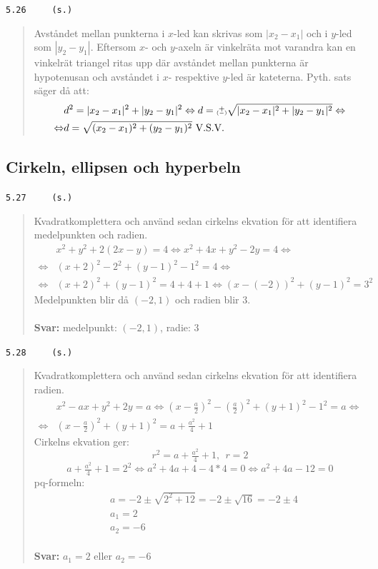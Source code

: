 \documentclass[a4paper]{article}
\newcommand{\tskcol}[1]{\textcolor{tskcol}{#1}}
\newcommand\varpm{\mathbin{\vcenter{\hbox{%
				\oalign{\hfil$\scriptstyle+$\hfil\cr
					\noalign{\kern-.5ex}					
					$\scriptscriptstyle({-})$\cr}%
			}}}}
\begin{document}
	\texttt{\tskcol{5.26~~~~ (s.)}}
	\begin{quotation}
		\noindent
		Avståndet mellan punkterna i $x$-led kan skrivas som $|x_2-x_1|$ och i $y$-led som $|y_2-y_1|$. Eftersom $x$- och $y$-axeln är vinkelräta mot varandra kan en vinkelrät triangel ritas upp där avståndet mellan punkterna är hypotenusan och avståndet i $x$- respektive $y$-led är kateterna. Pyth. sats säger då att: 
		\begin{align*}
		&d^2=|x_2-x_1|^2+|y_2-y_1|^2 \Leftrightarrow
		d=\varpm\sqrt{|x_2-x_1|^2+|y_2-y_1|^2} \Leftrightarrow \\ \Leftrightarrow
		&d=\sqrt{(x_2-x_1)^2+(y_2-y_1)^2} \text{ V.S.V.}
		\end{align*}
	\end{quotation}
	
	\subsection*{Cirkeln, ellipsen och hyperbeln}
	
	\texttt{\tskcol{5.27~~~~ (s.)}}
	\begin{quotation}
		\noindent
		Kvadratkomplettera och använd sedan cirkelns ekvation för att identifiera medelpunkten och radien.
		\begin{align*}
		&x^2+y^2+2(2x-y)=4 \Leftrightarrow
		x^2+4x+y^2-2y=4 \Leftrightarrow \\ \Leftrightarrow
		&(x+2)^2-2^2+(y-1)^2-1^2=4 \Leftrightarrow \\ \Leftrightarrow
		&(x+2)^2+(y-1)^2=4+4+1 \Leftrightarrow
		(x-(-2))^2+(y-1)^2=3^2
		\end{align*}
		Medelpunkten blir då $(-2,1)$ och radien blir $3$.
		\\ \\
		\textbf{Svar:} medelpunkt: $(-2,1)$, radie: $3$
	\end{quotation}
	
	\texttt{\tskcol{5.28~~~~ (s.)}}
	\begin{quotation}
		\noindent
		Kvadratkomplettera och använd sedan cirkelns ekvation för att identifiera radien.
		\begin{align*}
		&x^2-ax+y^2+2y=a \Leftrightarrow
		(x-\tfrac{a}{2})^2-(\tfrac{a}{2})^2+(y+1)^2-1^2=a \Leftrightarrow \\ \Leftrightarrow
		&(x-\tfrac{a}{2})^2+(y+1)^2=a+\tfrac{a^2}{4}+1
		\end{align*}
		Cirkelns ekvation ger:
		\[r^2=a+\tfrac{a^2}{4}+1, ~~ r=2\]
		\[a+\tfrac{a^2}{4}+1=2^2 \Leftrightarrow
		a^2+4a+4-4*4=0 \Leftrightarrow
		a^2+4a-12=0\]
		pq-formeln:
		\begin{align*}
		&a=-2\pm\sqrt{2^2+12}=-2\pm\sqrt{16}=-2\pm4 \\
		&a_1=2 \\
		&a_2=-6
		\end{align*}
		\\
		\textbf{Svar:} $a_1=2$ eller $a_2=-6$
	\end{quotation}
	
\end{document}
